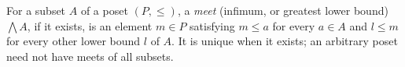 
For a subset $A$ of a poset $(P,\le)$, a \emph{meet} (infimum, or greatest lower bound) $\bigwedge A$, if it exists, is an element $m\in P$ satisfying $m\le a$ for every $a\in A$ and $l\le m$ for every other lower bound $l$ of $A$. It is unique when it exists; an arbitrary poset need not have meets of all subsets.
